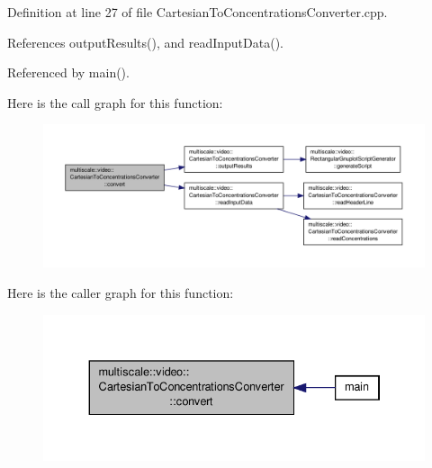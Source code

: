 Definition at line 27 of file Cartesian\-To\-Concentrations\-Converter.\-cpp.



References output\-Results(), and read\-Input\-Data().



Referenced by main().



Here is the call graph for this function\-:
\nopagebreak
\begin{figure}[H]
\begin{center}
\leavevmode
\includegraphics[width=350pt]{classmultiscale_1_1video_1_1CartesianToConcentrationsConverter_a27de97c7e35097bd17453fd07f33a6f1_cgraph}
\end{center}
\end{figure}




Here is the caller graph for this function\-:
\nopagebreak
\begin{figure}[H]
\begin{center}
\leavevmode
\includegraphics[width=334pt]{classmultiscale_1_1video_1_1CartesianToConcentrationsConverter_a27de97c7e35097bd17453fd07f33a6f1_icgraph}
\end{center}
\end{figure}



